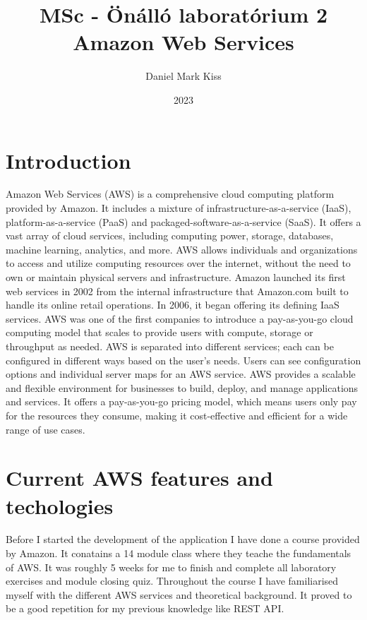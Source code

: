 \documentclass[11pt,a4paper,oneside]{report}
\title{\Huge{MSc - Önálló laboratórium 2}\\Amazon Web Services}
\author{\huge{Daniel Mark Kiss}}
\date{2023}
\begin{document}
\maketitle
\newpage
\tableofcontents
\pagebreak

\chapter{Introduction}

Amazon Web Services (AWS) is a comprehensive cloud computing platform provided by Amazon. It includes a mixture of infrastructure-as-a-service (IaaS), platform-as-a-service (PaaS) and packaged-software-as-a-service (SaaS). It offers a vast array of cloud services, including computing power, storage, databases, machine learning, analytics, and more. AWS allows individuals and organizations to access and utilize computing resources over the internet, without the need to own or maintain physical servers and infrastructure.
Amazon launched its first web services in 2002 from the internal infrastructure that Amazon.com built to handle its online retail operations. In 2006, it began offering its defining IaaS services. AWS was one of the first companies to introduce a pay-as-you-go cloud computing model that scales to provide users with compute, storage or throughput as needed.
AWS is separated into different services; each can be configured in different ways based on the user's needs. Users can see configuration options and individual server maps for an AWS service. AWS provides a scalable and flexible environment for businesses to build, deploy, and manage applications and services. It offers a pay-as-you-go pricing model, which means users only pay for the resources they consume, making it cost-effective and efficient for a wide range of use cases. \cite{techtagaws}

\chapter{Current AWS features and techologies}

Before I started the development of the application I have done a course provided by Amazon. It conatains a 14 module class where they teache the fundamentals of AWS.
It was roughly 5 weeks for me to finish and complete all laboratory exercises and module closing quiz. Throughout the course I have familiarised myself with the different AWS services and theoretical background. It proved to be a good repetition for my previous knowledge like REST API.
\end{document}
